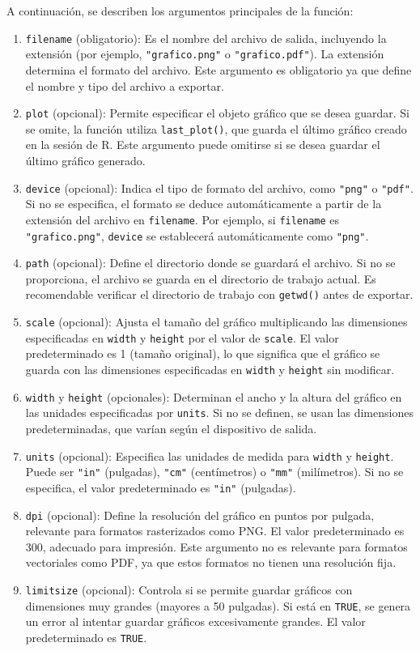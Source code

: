 \documentclass[
  spanish,
  a4paper,
  DIV=11,
  numbers=noendperiod,
  onepage,
  openany]{scrreprt}
\begin{document}
A continuación, se describen los argumentos principales de la función:

\begin{enumerate}
\def\labelenumi{\arabic{enumi}.}
\item
  \texttt{filename} (obligatorio): Es el nombre del archivo de salida,
  incluyendo la extensión (por ejemplo, \texttt{"grafico.png"} o
  \texttt{"grafico.pdf"}). La extensión determina el formato del
  archivo. Este argumento es obligatorio ya que define el nombre y tipo
  del archivo a exportar.
\item
  \texttt{plot} (opcional): Permite especificar el objeto gráfico que se
  desea guardar. Si se omite, la función utiliza \texttt{last\_plot()},
  que guarda el último gráfico creado en la sesión de R. Este argumento
  puede omitirse si se desea guardar el último gráfico generado.
\item
  \texttt{device} (opcional): Indica el tipo de formato del archivo,
  como \texttt{"png"} o \texttt{"pdf"}. Si no se especifica, el formato
  se deduce automáticamente a partir de la extensión del archivo en
  \texttt{filename}. Por ejemplo, si \texttt{filename} es
  \texttt{"grafico.png"}, \texttt{device} se establecerá automáticamente
  como \texttt{"png"}.
\item
  \texttt{path} (opcional): Define el directorio donde se guardará el
  archivo. Si no se proporciona, el archivo se guarda en el directorio
  de trabajo actual. Es recomendable verificar el directorio de trabajo
  con \texttt{getwd()} antes de exportar.
\item
  \texttt{scale} (opcional): Ajusta el tamaño del gráfico multiplicando
  las dimensiones especificadas en \texttt{width} y \texttt{height} por
  el valor de \texttt{scale}. El valor predeterminado es 1 (tamaño
  original), lo que significa que el gráfico se guarda con las
  dimensiones especificadas en \texttt{width} y \texttt{height} sin
  modificar.
\item
  \texttt{width} y \texttt{height} (opcionales): Determinan el ancho y
  la altura del gráfico en las unidades especificadas por
  \texttt{units}. Si no se definen, se usan las dimensiones
  predeterminadas, que varían según el dispositivo de salida.
\item
  \texttt{units} (opcional): Especifica las unidades de medida para
  \texttt{width} y \texttt{height}. Puede ser \texttt{"in"} (pulgadas),
  \texttt{"cm"} (centímetros) o \texttt{"mm"} (milímetros). Si no se
  especifica, el valor predeterminado es \texttt{"in"} (pulgadas).
\item
  \texttt{dpi} (opcional): Define la resolución del gráfico en puntos
  por pulgada, relevante para formatos rasterizados como PNG. El valor
  predeterminado es 300, adecuado para impresión. Este argumento no es
  relevante para formatos vectoriales como PDF, ya que estos formatos no
  tienen una resolución fija.
\item
  \texttt{limitsize} (opcional): Controla si se permite guardar gráficos
  con dimensiones muy grandes (mayores a 50 pulgadas). Si está en
  \texttt{TRUE}, se genera un error al intentar guardar gráficos
  excesivamente grandes. El valor predeterminado es \texttt{TRUE}.
\end{enumerate}
\end{document}
